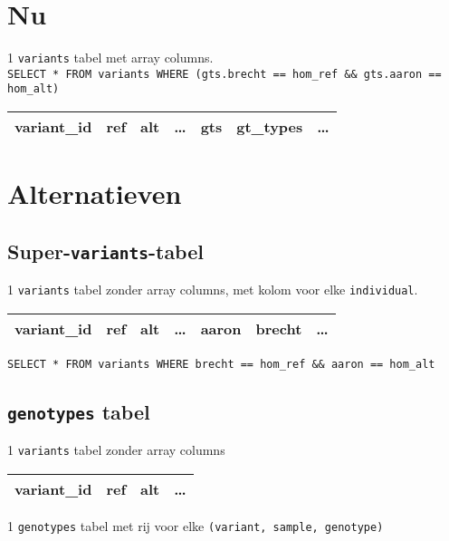 \documentclass{article}
\begin{document}
\section{Nu}

1 \texttt{variants} tabel met array columns.\\
\texttt{SELECT * FROM variants WHERE (gts.brecht == hom\_ref \&\& gts.aaron == hom\_alt)}
\begin{table}[h]
\begin{tabular}{@{}|l|l|l|l|l|l|l|@{}}
\toprule
variant\_id & ref & alt & \ldots & gts & gt\_types & \ldots \\ \bottomrule
\end{tabular}
\end{table}

\section{Alternatieven}

\subsection{Super-\texttt{variants}-tabel}

1 \texttt{variants} tabel zonder array columns, met kolom voor elke \texttt{individual}.\\
\begin{table}[!htbp]
\begin{tabular}{@{}|l|l|l|l|l|l|l|@{}}
\toprule
variant\_id & ref & alt & \ldots & aaron & brecht & \ldots \\ \bottomrule
\end{tabular}
\end{table}
\texttt{SELECT * FROM variants WHERE brecht == hom\_ref \&\& aaron == hom\_alt}

\subsection{\texttt{genotypes} tabel}

1 \texttt{variants} tabel zonder array columns

\begin{table}[!htbp]
\begin{tabular}{@{}|l|l|l|l|@{}}
\toprule
variant\_id & ref & alt & \ldots \\ \bottomrule
\end{tabular}
\end{table}

1 \texttt{genotypes} tabel met rij voor elke \texttt{(variant, sample, genotype)}
\end{document}
